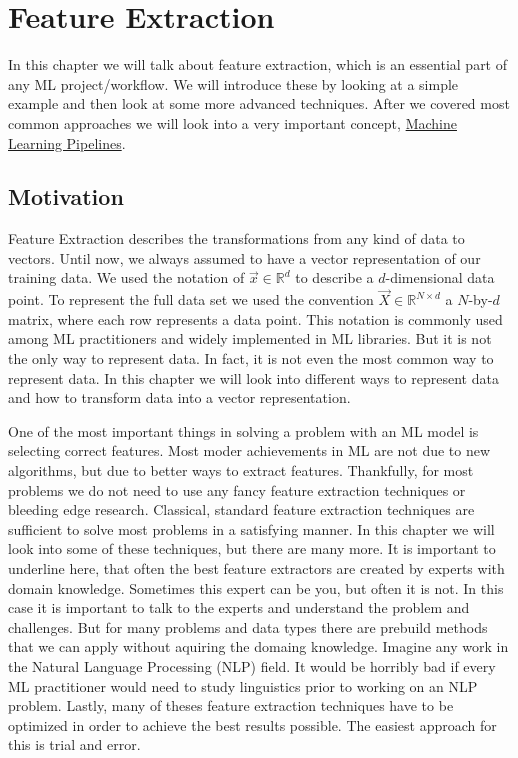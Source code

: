 \chapter{Feature Extraction}
In this chapter we will talk about feature extraction, which is an essential part of any ML project/workflow.
We will introduce these by looking at a simple example and then look at some more advanced techniques.
After we covered most common approaches we will look into a very important concept, \underline{Machine Learning Pipelines}.

\section{Motivation}
Feature Extraction describes the transformations from any kind of data to vectors.
Until now, we always assumed to have a vector representation of our training data.
We used the notation of $\vec{x} \in \mathbb{R}^d$ to describe a $d$-dimensional data point.
To represent the full data set we used the convention $\vec{X} \in \mathbb{R}^{N \times d}$ 
a $N$-by-$d$ matrix, where each row represents a data point. This notation is commonly used among ML practitioners
and widely implemented in ML libraries. But it is not the only way to represent data. In fact, it is not even the most common way to represent data.
In this chapter we will look into different ways to represent data and how to transform data into a vector representation.

One of the most important things in solving a problem with an ML model is selecting correct features.
Most moder achievements in ML are not due to new algorithms, but due to better ways to extract features.
Thankfully, for most problems we do not need to use any fancy feature extraction techniques or bleeding edge research.
Classical, standard feature extraction techniques are sufficient to solve most problems in a satisfying manner.
In this chapter we will look into some of these techniques, but there are many more.
It is important to underline here, that often the best feature extractors are created by experts with domain knowledge.
Sometimes this expert can be you, but often it is not. In this case it is important to talk to the experts and understand the problem and challenges.
But for many problems and data types there are prebuild methods that we can apply without aquiring the domaing knowledge.
Imagine any work in the Natural Language Processing (NLP) field. It would be horribly bad if every ML practitioner would need to study linguistics prior
to working on an NLP problem.
Lastly, many of theses feature extraction techniques have to be optimized in order to achieve the best results possible. The easiest approach for this is trial and error.

